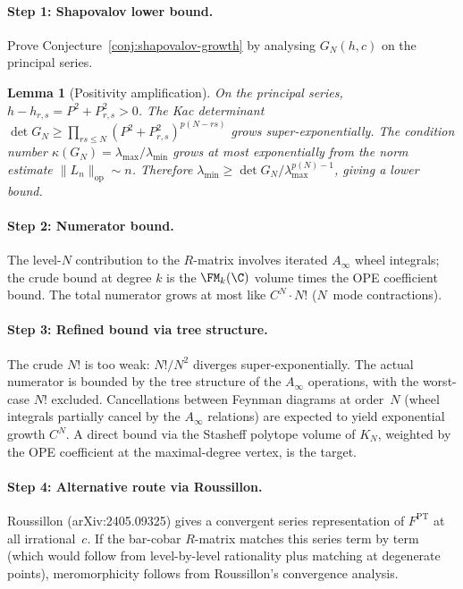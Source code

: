 \documentclass[11pt]{amsart}
\newtheorem{lemma}[theorem]{Lemma}
\theoremstyle{definition}
\theoremstyle{remark}
\providecommand{\Ainf}{A_\infty}
\begin{document}
\paragraph{Step 1: Shapovalov lower bound.}
Prove Conjecture~\ref{conj:shapovalov-growth} by analysing
$G_N(h, c)$ on the principal series.

\begin{lemma}[Positivity amplification]
On the principal series, $h - h_{r,s} = P^2 + P_{r,s}^2 > 0$.
The Kac determinant $\det G_N \ge \prod_{rs \le N}
(P^2 + P_{r,s}^2)^{p(N-rs)}$ grows super-exponentially. The condition
number $\kappa(G_N) = \lambda_{\max}/\lambda_{\min}$ grows at most
exponentially from the norm estimate
$\|L_n\|_{\mathrm{op}} \sim n$. Therefore
$\lambda_{\min} \ge \det G_N / \lambda_{\max}^{p(N)-1}$, giving a
lower bound.
\end{lemma}

\paragraph{Step 2: Numerator bound.}
The level-$N$ contribution to the $R$-matrix involves iterated
$\Ainf$ wheel integrals; the crude bound at degree $k$ is the
$\FM_k(\C)$ volume times the OPE coefficient bound. The total
numerator grows at most like $C^N \cdot N!$ ($N$~mode contractions).

\paragraph{Step 3: Refined bound via tree structure.}
The crude $N!$ is too weak: $N!/N^2$ diverges super-exponentially.
The actual numerator is bounded by the tree structure of the
$\Ainf$ operations, with the worst-case $N!$ excluded. Cancellations
between Feynman diagrams at order~$N$ (wheel integrals partially
cancel by the $\Ainf$ relations) are expected to yield
exponential growth $C^N$. A direct bound via
the Stasheff polytope volume of $K_N$, weighted by the OPE
coefficient at the maximal-degree vertex, is the target.

\paragraph{Step 4: Alternative route via Roussillon.}
Roussillon (arXiv:2405.09325) gives a convergent series
representation of $F^{\mathrm{PT}}$ at all irrational~$c$. If the
bar-cobar $R$-matrix matches this series term by term (which would
follow from level-by-level rationality plus matching at degenerate
points), meromorphicity follows from Roussillon's convergence
analysis.
\end{document}
